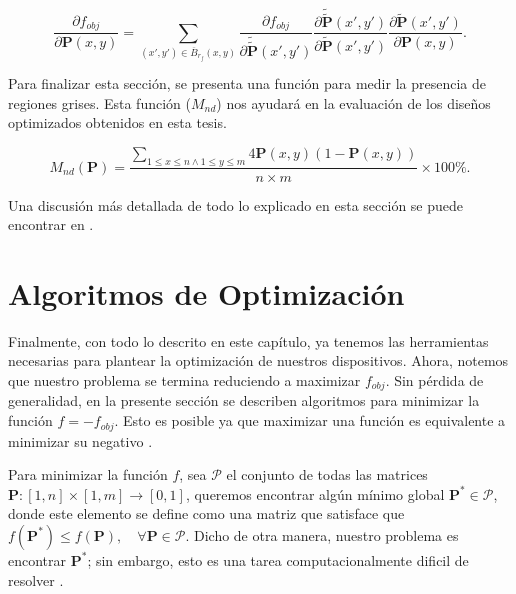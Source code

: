 \begin{equation}
  \frac{\partial f_{obj}}{\partial \boldsymbol{P}(x, y)} = \displaystyle\sum_{(x', y') \in \overline{B}_{r_f}(x, y)}
  \frac{\partial f_{obj}}{\partial \widetilde{\widetilde{\boldsymbol{P}}}(x', y')}
  \frac{\partial \widetilde{\widetilde{\boldsymbol{P}}}(x', y')}{\partial \widetilde{\boldsymbol{P}}(x', y')}
   \frac{\partial \widetilde{\boldsymbol{P}}(x', y')}{\partial \boldsymbol{P}(x, y)}.
  \label{eq:fobjgrad}
\end{equation}

Para finalizar esta sección, se presenta una función para medir la presencia de regiones grises.
Esta función ($M_{nd}$) nos ayudará en la evaluación de los diseños optimizados obtenidos en esta tesis.

\begin{equation}
  M_{nd} (\boldsymbol{P}) = \frac{\sum_{1 \leq x \leq n \land 1 \leq y \leq m}
  4 \boldsymbol{P}(x, y)(1 - \boldsymbol{P}(x, y))}{n \times m} \times 100 \%.
\end{equation}

Una discusión más detallada de todo lo explicado en esta sección se puede encontrar en \cite{Lazarov2016}.

\section{Algoritmos de Optimización}\label{sec:alg-opt}

Finalmente, con todo lo descrito en este capítulo, ya tenemos las herramientas necesarias
para plantear la optimización de nuestros dispositivos.
Ahora, notemos que nuestro problema se termina reduciendo a maximizar $f_{obj}$.
Sin pérdida de generalidad, en la presente sección se describen algoritmos
para minimizar la función $f = -f_{obj}$.
Esto es posible ya que maximizar una función es equivalente a minimizar su negativo \citep{Mykel2019}.


Para minimizar la función $f$, sea $\pmb{\mathscr{P}}$ el conjunto de todas las matrices 
$\boldsymbol{P}: [1, n] \times [1, m] \to [0, 1]$, queremos encontrar algún mínimo global 
$\boldsymbol{P^{*}} \in \pmb{\mathscr{P}}$, 
donde este elemento se define como una matriz que satisface que
$f(\boldsymbol{P^{*}}) \leq f(\boldsymbol{P}), \quad \forall \boldsymbol{P} \in \pmb{\mathscr{P}}$. 
Dicho de otra manera, nuestro problema es encontrar $\boldsymbol{P^{*}}$; sin embargo,
esto es una tarea computacionalmente dificil de resolver \citep{Angeris2021}.

